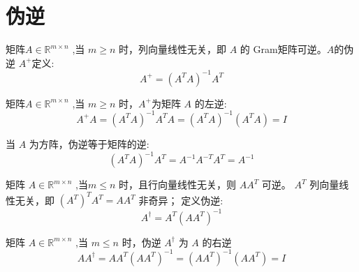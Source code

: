 \section{伪逆}

\begin{definition}
    矩阵$A \in \mathbb{R}^{m \times n} $ ,当 $ m \geq n $ 时，列向量线性无关，即 $ A $ 的 Gram矩阵可逆。$A$的伪逆 $ A^{+} $定义:
    \begin{equation}
    A^{+}=\left(A^{T} A\right)^{-1} A^{T}
    \end{equation}

\end{definition}


\begin{theorem}
    矩阵$A \in \mathbb{R}^{m \times n} $ ,当 $ m \geq n $ 时，$ A^{+} $为矩阵 $ A $ 的左逆:
\begin{equation}
A^{+} A=\left(A^{T} A\right)^{-1} A^{T} A=\left(A^{T} A\right)^{-1}\left(A^{T} A\right)=I
\end{equation}

\end{theorem}

\begin{theorem}
    当 $ A $ 为方阵，伪逆等于矩阵的逆:
\begin{equation}
\left(A^{T} A\right)^{-1} A^{T}=A^{-1} A^{-T} A^{T}=A^{-1}
\end{equation}
\end{theorem}



\begin{definition}
    矩阵 $  {A} \in \mathbb{R}^{m \times n} $ ,当$m \leq  {n} $ 时，且行向量线性无关，则 $ A A^{T} $ 可逆。 $ A^{T} $ 列向量线性无关，即 $ \left(A^{T}\right)^{T} A^{T}= {A} A^{T} $ 非奇异；
定义伪逆:
\begin{equation}
A^{\dagger}=A^{T}\left(A A^{T}\right)^{-1}
\end{equation}
\end{definition}

\begin{theorem}
    矩阵 $  {A} \in \mathbb{R}^{m \times n} $ ,当 $m \leq  {n} $ 时，伪逆 $ A^{\dagger} $ 为 $ A $ 的右逆
\begin{equation}
A A^{\dagger}=A A^{T}\left(A A^{T}\right)^{-1}=\left(A A^{T}\right)^{-1}\left(A A^{T}\right)=I
\end{equation}
\end{theorem}


